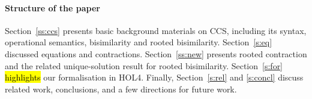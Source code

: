 \paragraph{Structure of the paper} 
Section~\ref{ss:ccs} presents basic background materials on CCS,
including its syntax, operational semantics, bisimilarity and rooted
bisimilarity. Section~\ref{s:eq} discussed equations and contractions.
 Section~\ref{ss:new} presents rooted contraction and the related
 unique-solution result for rooted bisimilarity. Section~\ref{s:for}
 \hl{highlights} our formalisation in HOL4. Finally,  Section~\ref{s:rel} and
 \ref{s:concl} discuss related work, conclusions,  and  a few
 directions for future work.